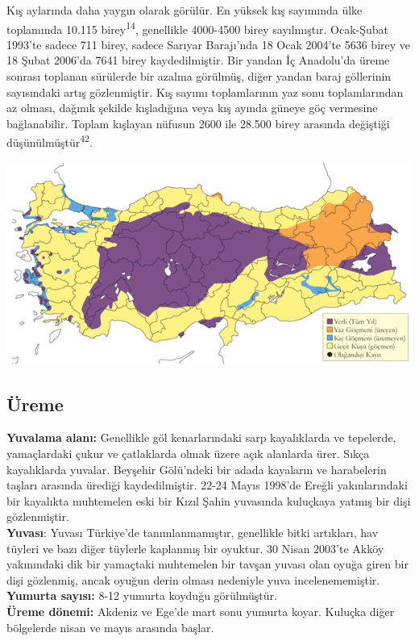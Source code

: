 \documentclass[
  letterpaper,
  DIV=11,
  numbers=noendperiod]{scrreprt}
\begin{document}
Kış aylarında daha yaygın olarak görülür. En yüksek kış sayımında ülke
toplamında 10.115 birey\textsuperscript{14}, genellikle 4000-4500 birey
sayılmıştır. Ocak-Şubat 1993'te sadece 711 birey, sadece Sarıyar
Barajı'nda 18 Ocak 2004'te 5636 birey ve 18 Şubat 2006'da 7641 birey
kaydedilmiştir. Bir yandan İç Anadolu'da üreme sonrası toplanan
sürülerde bir azalma görülmüş, diğer yandan baraj göllerinin sayısındaki
artış gözlenmiştir. Kış sayımı toplamlarının yaz sonu toplamlarından az
olması, dağınık şekilde kışladığına veya kış ayında güneye göç vermesine
bağlanabilir. Toplam kışlayan nüfusun 2600 ile 28.500 birey arasında
değiştiği düşünülmüştür\textsuperscript{42}.

\includegraphics{images/harita_Page_013.png}

\hypertarget{uxfcreme-12}{%
\subsection{\texorpdfstring{\textbf{Üreme}}{Üreme}}\label{uxfcreme-12}}

\textbf{Yuvalama alanı:} Genellikle göl kenarlarındaki sarp kayalıklarda
ve tepelerde, yamaçlardaki çukur ve çatlaklarda olmak üzere açık
alanlarda ürer. Sıkça kayalıklarda yuvalar. Beyşehir Gölü'ndeki bir
adada kayaların ve harabelerin taşları arasında ürediği kaydedilmiştir.
22-24 Mayıs 1998'de Ereğli yakınlarındaki bir kayalıkta muhtemelen eski
bir Kızıl Şahin yuvasında kuluçkaya yatmış bir dişi gözlenmiştir.\\
\textbf{Yuvası}: Yuvası Türkiye'de tanımlanmamıştır, genellikle bitki
artıkları, hav tüyleri ve bazı diğer tüylerle kaplanmış bir oyuktur. 30
Nisan 2003'te Akköy yakınındaki dik bir yamaçtaki muhtemelen bir tavşan
yuvası olan oyuğa giren bir dişi gözlenmiş, ancak oyuğun derin olması
nedeniyle yuva incelenememiştir.\\
\textbf{Yumurta sayısı:} 8-12 yumurta koyduğu görülmüştür.\\
\textbf{Üreme dönemi:} Akdeniz ve Ege'de mart sonu yumurta koyar.
Kuluçka diğer bölgelerde nisan ve mayıs arasında başlar.
\end{document}
